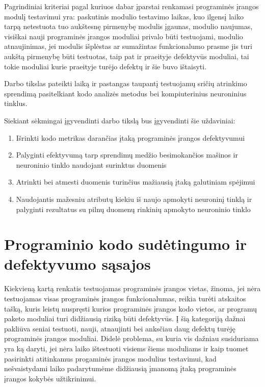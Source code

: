 \documentclass{VUMIFPSbakalaurinis}
\begin{document}
Pagrindiniai kriteriai pagal kuriuos dabar įparstai renkamasi programinės įrangos modulį testavimui yra: paskutinis modulio testavimo laikas, kuo ilgensį laiko tarpą netestuota tuo aukštesnę pirmenybę modulis įgaunas, modulio naujumas, visiškai nauji programinės įrangos moduliai privalo būti testuojami, modulio atnaujinimas, jei modulis išplėstas ar sumažintas funkcionalumo prasme jis turi aukštą pirmenybę būti testuotas, taip pat ir praeityje defektyvūs moduliai, tai tokie moduliai kurie praeityje turėjo defektų ir šie buvo ištaisyti.

Darbo tikslas pateikti laiką ir pastangas taupantį testuojamų sričių atrinkimo sprendimą pasitelkiant kodo analizės metodus bei kompiuterinius neuroninius tinklus.

Siekiant sėkmingai įgyvendinti darbo tikslą bus įgyvendinti šie uždaviniai:
\begin{enumerate}
\item Išrinkti kodo metrikas darančias įtaką programinės įrangos defektyvumui
\item Palyginti efektyvumą tarp sprendimų medžio besimokančios mašinos ir neuroninio tinklo naudojant surinktus duomenis
\item Atrinkti bei atmesti duomenis turinčius mažiausią įtaką galutiniam spėjimui
\item Naudojantis mažesniu atributų kiekiu iš naujo apmokyti neuroninį tinklą ir palyginti rezultatus su pilnų duomenų rinkinių apmokyto neuroninio tinklo
\end{enumerate}
 
\section{Programinio kodo sudėtingumo ir defektyvumo sąsajos}
Kiekvieną kartą renkatis testuojamas programinės įrangos vietas, žinoma, jei nėra testuojamas visas programinės įrangos funkcionalumas, reikia turėti atskaitos tašką, kuris leistų nuspręsti kurios programinės įrangos kodo vietos, ar programų paketo moduliai turi didžiausią riziką būti defektyvūs. Į šią kategoriją dažnai pakliūva seniai testuoti, nauji, atnaujinti bei anksčiau daug defektų turėję programinės įrangos moduliai. Didelė problema, su kuria vis dažniau susiduriama yra ką daryti, jei nėra laiko ištestuoti visiems šiems moduliams ir kaip tuomet pasirinkti atitinkamus progaminės įrangos modulius testavimui, kad nešvaistydami laiko padarytumėme didžiausią įmanomą įtaką programinės įrangos kokybės užtikrinimui. 
\end{document}
